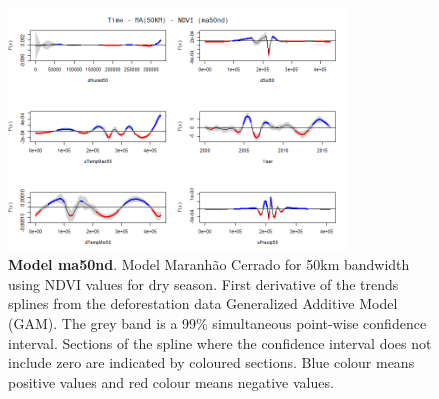 \begin{table}

\begin{figure}[H]
 \centering
        \centering
        \includegraphics[width=0.8\textwidth]{ma50nd.png} %
        \caption[Model Cerrado Maranhão for 50km bandwidth using NDVI values for dry season. First derivative of the trends splines from the deforestation data Generalized Additive Model (GAM)]{\textbf{Model ma50nd}. Model Maranhão Cerrado for 50km bandwidth using NDVI values for dry season. First derivative of the trends splines from the deforestation data Generalized Additive Model (GAM). The grey band is a 99\% simultaneous point-wise confidence interval. Sections of the spline where the confidence interval does not include zero are indicated by coloured sections. Blue colour means positive values and red colour means negative values.}
\end{figure}
\end{table}

